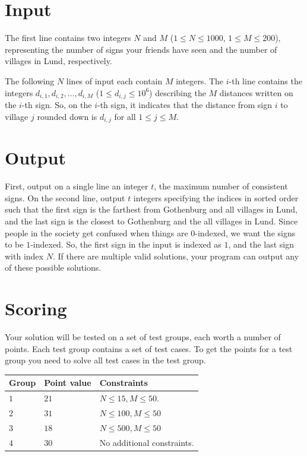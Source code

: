 \section*{Input}
\noindent
The first line contains two integers $N$ and $M$ ($1 \leq N \leq 1000$, $1 \leq M \leq 200$), 
representing the number of signs your friends have seen and the number of villages in Lund, respectively.

The following $N$ lines of input each contain $M$ integers. The $i$-th line contains the integers $d_{i,1}, d_{i,2}, \ldots, d_{i,M}$ ($1 \leq d_{i,j} \leq 10^6$) describing the $M$ distances written on the $i$-th sign. 
So, on the $i$-th sign, it indicates that the distance from sign $i$ to village $j$ rounded down is $d_{i,j}$ for all $1 \leq j \leq M$.

\section*{Output}
\noindent
First, output on a single line an integer $t$, the maximum number of consistent signs.
On the second line, output $t$ integers specifying the indices in sorted order such that the first sign is the farthest from Gothenburg and all villages in Lund, 
and the last sign is the closest to Gothenburg and the all villages in Lund.
Since people in the society get confused when things are $0$-indexed, we want the signs to be $1$-indexed. 
So, the first sign in the input is indexed as $1$, and the last sign with index $N$.
If there are multiple valid solutions, your program can output any of these possible solutions.

\section*{Scoring}
Your solution will be tested on a set of test groups, each worth a number of points. 
Each test group contains a set of test cases. 
To get the points for a test group you need to solve all test cases in the test group.

\noindent
\begin{tabular}{| l | l | p{12cm} |}
  \hline
  \textbf{Group} & \textbf{Point value} & \textbf{Constraints} \\ \hline
  $1$    & $21$         & $N \leq 15, M \leq 50$.  \\ \hline
  $2$    & $31$         & $N \leq 100, M \leq 50$ \\ \hline
  $3$    & $18$         & $N \leq 500, M \leq 50$ \\ \hline
  $4$    & $30$         & No additional constraints. \\ \hline
\end{tabular}



